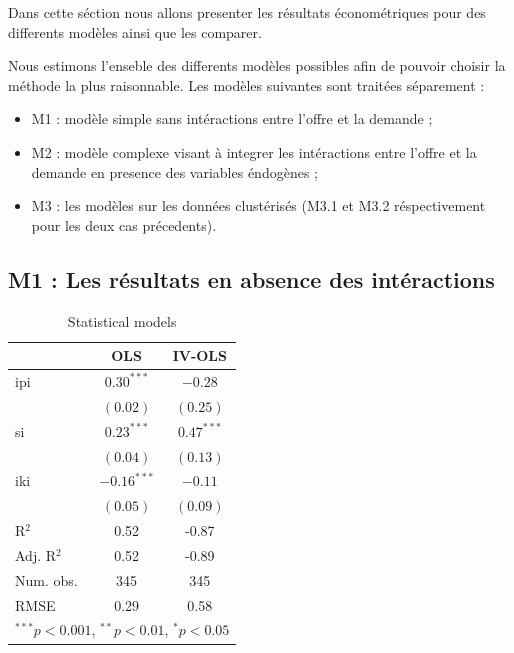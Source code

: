 \documentclass[11pt,]{article}
\providecommand{\tightlist}{%
  \setlength{\itemsep}{0pt}\setlength{\parskip}{0pt}}
\begin{document}
Dans cette séction nous allons presenter les résultats économétriques
pour des differents modèles ainsi que les comparer.

Nous estimons l'enseble des differents modèles possibles afin de pouvoir
choisir la méthode la plus raisonnable. Les modèles suivantes sont
traitées séparement :

\begin{itemize}
\tightlist
\item
  M1 : modèle simple sans intéractions entre l'offre et la demande ;
\item
  M2 : modèle complexe visant à integrer les intéractions entre l'offre
  et la demande en presence des variables éndogènes ;
\item
  M3 : les modèles sur les données clustérisés (M3.1 et M3.2
  réspectivement pour les deux cas précedents).
\end{itemize}

\hypertarget{m1-les-resultats-en-absence-des-interactions}{%
\subsection{M1 : Les résultats en absence des
intéractions}\label{m1-les-resultats-en-absence-des-interactions}}

\FloatBarrier

\begin{table}[!htbp]
\begin{center}
\begin{tabular}{l c c }
\hline
 & OLS & IV-OLS \\
\hline
ipi        & $0.30^{***}$  & $-0.28$      \\
           & $(0.02)$      & $(0.25)$     \\
si         & $0.23^{***}$  & $0.47^{***}$ \\
           & $(0.04)$      & $(0.13)$     \\
iki        & $-0.16^{***}$ & $-0.11$      \\
           & $(0.05)$      & $(0.09)$     \\
\hline
R$^2$      & 0.52          & -0.87        \\
Adj. R$^2$ & 0.52          & -0.89        \\
Num. obs.  & 345           & 345          \\
RMSE       & 0.29          & 0.58         \\
\hline
\multicolumn{3}{l}{\scriptsize{$^{***}p<0.001$, $^{**}p<0.01$, $^*p<0.05$}}
\end{tabular}
\caption{Statistical models}
\label{table : ols et ivols}
\end{center}
\end{table}
\end{document}
